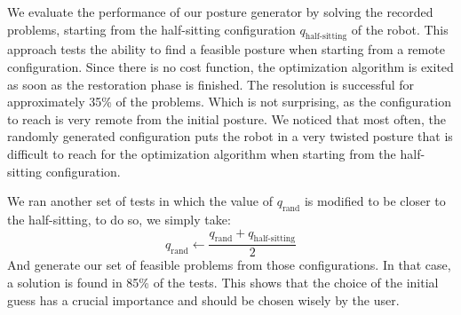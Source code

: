 

We evaluate the performance of our posture generator by solving the recorded problems, starting from the half-sitting configuration $q_\text{half-sitting}$ of the robot.
This approach tests the ability to find a feasible posture when starting from a remote configuration.
Since there is no cost function, the optimization algorithm is exited as soon as the restoration phase is finished.
The resolution is successful for approximately 35\% of the problems.
Which is not surprising, as the configuration to reach is very remote from the initial posture.
We noticed that most often, the randomly generated configuration puts the robot in a very twisted posture that is difficult to reach for the optimization algorithm when starting from the half-sitting configuration.

We ran another set of tests in which the value of $q_\text{rand}$ is modified to be closer to the half-sitting, to do so, we simply take:
\begin{equation}
  q_\text{rand} \leftarrow \frac{q_\text{rand}+q_\text{half-sitting}}{2}
\end{equation}
And generate our set of feasible problems from those configurations.
In that case, a solution is found in 85\% of the tests.
This shows that the choice of the initial guess has a crucial importance and should be chosen wisely by the user.

